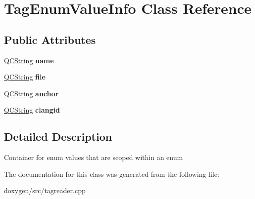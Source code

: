 \hypertarget{class_tag_enum_value_info}{}\section{Tag\+Enum\+Value\+Info Class Reference}
\label{class_tag_enum_value_info}
\subsection*{Public Attributes}
\begin{DoxyCompactItemize}
\item 
\mbox{\label{class_tag_enum_value_info_a39757957cc24cb10975e073b3f32d6c9}} 
\mbox{\hyperlink{class_q_c_string}{Q\+C\+String}} {\bfseries name}
\item 
\mbox{\label{class_tag_enum_value_info_a5f25892dd8fae1bb87c645397a5152f0}} 
\mbox{\hyperlink{class_q_c_string}{Q\+C\+String}} {\bfseries file}
\item 
\mbox{\label{class_tag_enum_value_info_aac9535c84841d7b352e0bc9da1095a6f}} 
\mbox{\hyperlink{class_q_c_string}{Q\+C\+String}} {\bfseries anchor}
\item 
\mbox{\label{class_tag_enum_value_info_ab5084426052301a148357fde91974253}} 
\mbox{\hyperlink{class_q_c_string}{Q\+C\+String}} {\bfseries clangid}
\end{DoxyCompactItemize}


\subsection{Detailed Description}
Container for enum values that are scoped within an enum 

The documentation for this class was generated from the following file\+:\begin{DoxyCompactItemize}
\item 
doxygen/src/tagreader.\+cpp\end{DoxyCompactItemize}
